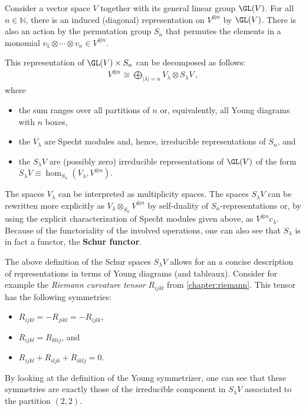     Consider a vector space $V$ together with its general linear group $\GL(V)$. For all $n\in\mathbb{N}$, there is an induced (diagonal) representation on $V^{\otimes n}$ by $\GL(V)$. There is also an action by the permutation group $S_n$ that permutes the elements in a monomial $v_1\otimes\cdots\otimes v_n\in V^{\otimes n}$.
    \begin{theorem}
        This representation of $\GL(V)\times S_n$ can be decomposed as follows:
        \begin{gather}
            V^{\otimes n}\cong\bigoplus_{|\lambda|=n}V_\lambda\otimes S_\lambda V\,,
        \end{gather}
        where
        \begin{itemize}
            \item the sum ranges over all partitions of $n$ or, equivalently, all Young diagrams with $n$ boxes,
            \item the $V_\lambda$ are Specht modules and, hence, irreducible representations of $S_n$, and
            \item the $S_\lambda V$ are (possibly zero) irreducible representations of $\GL(V)$ of the form $S_\lambda V \equiv\hom_{S_n}(V_\lambda,V^{\otimes n})$.
        \end{itemize}
    \end{theorem}
    The spaces $V_\lambda$ can be interpreted as multiplicity spaces. The spaces $S_\lambda V$ can be rewritten more explicitly as $V_\lambda\otimes_{S_n} V^{\otimes n}$ by self-duality of $S_n$-representations or, by using the explicit characterization of Specht modules given above, as $V^{\otimes n}c_\lambda$. Because of the functoriality of the involved operations, one can also see that $S_\lambda$ is in fact a functor, the \textbf{Schur functor}.

    \begin{example}
        The above definition of the Schur spaces $S_\lambda V$ allows for an a concise description of representations in terms of Young diagrams (and tableaux). Consider for example the \textit{Riemann curvature tensor} $R_{ijkl}$ from \cref{chapter:riemann}. This tensor has the following symmetries:
        \begin{itemize}
            \item $R_{ijkl} = -R_{jikl} = -R_{ijlk}$,
            \item $R_{ijkl} = R_{klij}$, and
            \item $R_{ijkl} + R_{iljk} + R_{iklj} = 0$.
        \end{itemize}
        By looking at the definition of the Young symmetrizer, one can see that these symmetries are exactly those of the irreducible component in $S_\lambda V$ associated to the partition $(2,2)$.

    \end{example}

